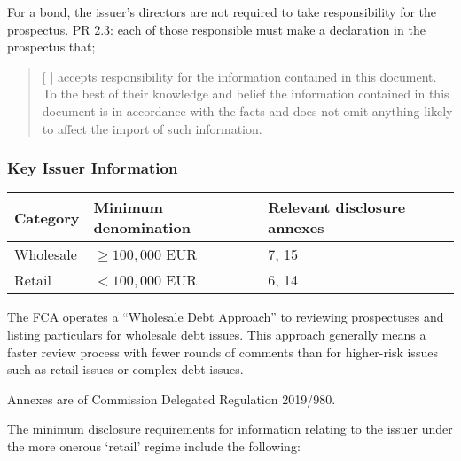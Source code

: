 \documentclass[
]{article}
\begin{document}
For a bond, the issuer's directors are not required to take
responsibility for the prospectus. PR 2.3: each of those responsible
must make a declaration in the prospectus that;

\begin{quote}
{[} {]} accepts responsibility for the information contained in this
document. To the best of their knowledge and belief the information
contained in this document is in accordance with the facts and does not
omit anything likely to affect the import of such information.
\end{quote}

\hypertarget{key-issuer-information}{%
\subsubsection{Key Issuer Information}\label{key-issuer-information}}

\begin{longtable}[]{@{}lll@{}}
\toprule()
Category & Minimum denomination & Relevant disclosure annexes \\
\midrule()
\endhead
Wholesale & \(\geq 100,000\) EUR & 7, 15 \\
Retail & \(< 100,000\) EUR & 6, 14 \\
\bottomrule()
\end{longtable}

The FCA operates a ``Wholesale Debt Approach'' to reviewing prospectuses
and listing particulars for wholesale debt issues. This approach
generally means a faster review process with fewer rounds of comments
than for higher-risk issues such as retail issues or complex debt
issues.

Annexes are of Commission Delegated Regulation 2019/980.

The minimum disclosure requirements for information relating to the
issuer under the more onerous `retail' regime include the following:
\end{document}
